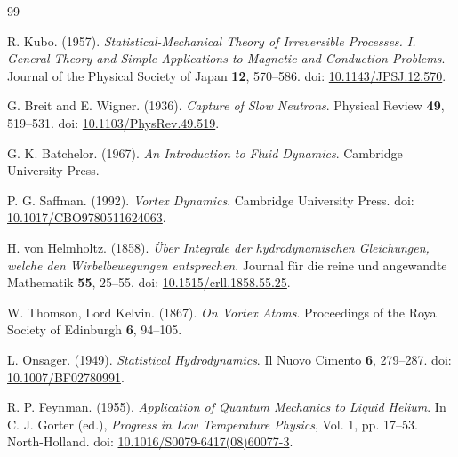     \ifresearchtrackincluded\else
\begin{thebibliography}{99}
        
        R. Kubo. (1957).
        \textit{Statistical-Mechanical Theory of Irreversible Processes. I. General Theory and Simple Applications to Magnetic and Conduction Problems}.
        Journal of the Physical Society of Japan \textbf{12}, 570--586.
        doi: \href{https://doi.org/10.1143/JPSJ.12.570}{10.1143/JPSJ.12.570}.
        
        G. Breit and E. Wigner. (1936).
        \textit{Capture of Slow Neutrons}.
        Physical Review \textbf{49}, 519--531.
        doi: \href{https://doi.org/10.1103/PhysRev.49.519}{10.1103/PhysRev.49.519}.
        
        G. K. Batchelor. (1967).
        \textit{An Introduction to Fluid Dynamics}.
        Cambridge University Press.
        
        P. G. Saffman. (1992).
        \textit{Vortex Dynamics}.
        Cambridge University Press.
        doi: \href{https://doi.org/10.1017/CBO9780511624063}{10.1017/CBO9780511624063}.
        
        H. von Helmholtz. (1858).
        \textit{\"Uber Integrale der hydrodynamischen Gleichungen, welche den Wirbelbewegungen entsprechen}.
        Journal f\"ur die reine und angewandte Mathematik \textbf{55}, 25--55.
        doi: \href{https://doi.org/10.1515/crll.1858.55.25}{10.1515/crll.1858.55.25}.
        
        W. Thomson, Lord Kelvin. (1867).
        \textit{On Vortex Atoms}.
        Proceedings of the Royal Society of Edinburgh \textbf{6}, 94--105.
        
        L. Onsager. (1949).
        \textit{Statistical Hydrodynamics}.
        Il Nuovo Cimento \textbf{6}, 279--287.
        doi: \href{https://doi.org/10.1007/BF02780991}{10.1007/BF02780991}.
        
        R. P. Feynman. (1955).
        \textit{Application of Quantum Mechanics to Liquid Helium}.
        In C. J. Gorter (ed.), \textit{Progress in Low Temperature Physics}, Vol. 1, pp. 17--53.
        North-Holland.
        doi: \href{https://doi.org/10.1016/S0079-6417(08)60077-3}{10.1016/S0079-6417(08)60077-3}.
        

\end{thebibliography}

